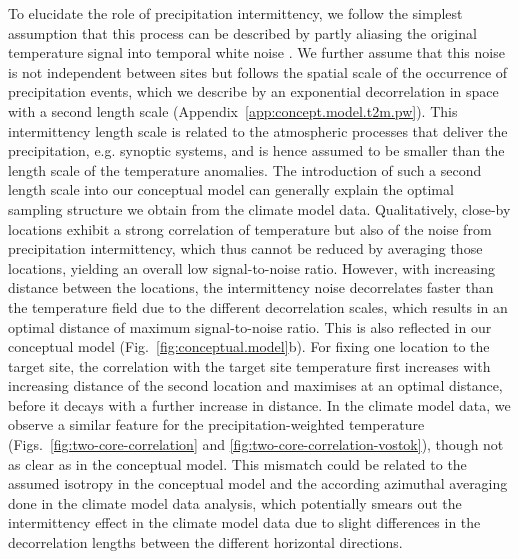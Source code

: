 \documentclass[cp, manuscript, draft]{copernicus}
\begin{document}
To elucidate the role of precipitation intermittency, we follow the simplest
assumption that this process can be described by partly aliasing the original
temperature signal into temporal white noise \citep{Laepple2018,Casado2019}. We
further assume that this noise is not independent between sites but follows the
spatial scale of the occurrence of precipitation events, which we describe by an
exponential decorrelation in space with a second length scale
(Appendix~\ref{app:concept.model.t2m.pw}). This intermittency length scale is
related to the atmospheric processes that deliver the precipitation,
e.g. synoptic systems, and is hence assumed to be smaller than the length scale
of the temperature anomalies. The introduction of such a second length scale
into our conceptual model can generally explain the optimal sampling structure
we obtain from the climate model data. Qualitatively, close-by locations exhibit
a strong correlation of temperature but also of the noise from precipitation
intermittency, which thus cannot be reduced by averaging those locations,
yielding an overall low signal-to-noise ratio. However, with increasing distance
between the locations, the intermittency noise decorrelates faster than the
temperature field due to the different decorrelation scales, which results in an
optimal distance of maximum signal-to-noise ratio. This is also reflected in our
conceptual model (Fig.~\ref{fig:conceptual.model}b). For fixing one location to
the target site, the correlation with the target site temperature first
increases with increasing distance of the second location and maximises at an
optimal distance, before it decays with a further increase in distance. In the
climate model data, we observe a similar feature for the precipitation-weighted
temperature (Figs.~\ref{fig:two-core-correlation} and
\ref{fig:two-core-correlation-vostok}), though not as clear as in the conceptual
model. This mismatch could be related to the assumed isotropy in the conceptual
model and the according azimuthal averaging done in the climate model data
analysis, which potentially smears out the intermittency effect in the climate
model data due to slight differences in the decorrelation lengths between the
different horizontal directions.
\end{document}

